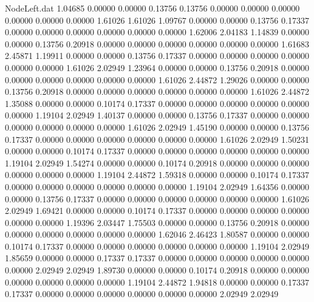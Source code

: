 \begin{filecontents}{NodeLeft.dat}
   1.04685    0.00000    0.00000     0.13756    0.13756    0.00000    0.00000    0.00000    0.00000    0.00000    0.00000    1.61026    1.61026
   1.09767    0.00000    0.00000     0.13756    0.17337    0.00000    0.00000    0.00000    0.00000    0.00000    0.00000    1.62006    2.04183
   1.14839    0.00000    0.00000     0.13756    0.20918    0.00000    0.00000    0.00000    0.00000    0.00000    0.00000    1.61683    2.45871
   1.19911    0.00000    0.00000     0.13756    0.17337    0.00000    0.00000    0.00000    0.00000    0.00000    0.00000    1.61026    2.02949
   1.23964    0.00000    0.00000     0.13756    0.20918    0.00000    0.00000    0.00000    0.00000    0.00000    0.00000    1.61026    2.44872
   1.29026    0.00000    0.00000     0.13756    0.20918    0.00000    0.00000    0.00000    0.00000    0.00000    0.00000    1.61026    2.44872
   1.35088    0.00000    0.00000     0.10174    0.17337    0.00000    0.00000    0.00000    0.00000    0.00000    0.00000    1.19104    2.02949
   1.40137    0.00000    0.00000     0.13756    0.17337    0.00000    0.00000    0.00000    0.00000    0.00000    0.00000    1.61026    2.02949
   1.45190    0.00000    0.00000     0.13756    0.17337    0.00000    0.00000    0.00000    0.00000    0.00000    0.00000    1.61026    2.02949
   1.50231    0.00000    0.00000     0.10174    0.17337    0.00000    0.00000    0.00000    0.00000    0.00000    0.00000    1.19104    2.02949
   1.54274    0.00000    0.00000     0.10174    0.20918    0.00000    0.00000    0.00000    0.00000    0.00000    0.00000    1.19104    2.44872
   1.59318    0.00000    0.00000     0.10174    0.17337    0.00000    0.00000    0.00000    0.00000    0.00000    0.00000    1.19104    2.02949
   1.64356    0.00000    0.00000     0.13756    0.17337    0.00000    0.00000    0.00000    0.00000    0.00000    0.00000    1.61026    2.02949
   1.69421    0.00000    0.00000     0.10174    0.17337    0.00000    0.00000    0.00000    0.00000    0.00000    0.00000    1.19396    2.03447
   1.75503    0.00000    0.00000     0.13756    0.20918    0.00000    0.00000    0.00000    0.00000    0.00000    0.00000    1.62046    2.46423
   1.80587    0.00000    0.00000     0.10174    0.17337    0.00000    0.00000    0.00000    0.00000    0.00000    0.00000    1.19104    2.02949
   1.85659    0.00000    0.00000     0.17337    0.17337    0.00000    0.00000    0.00000    0.00000    0.00000    0.00000    2.02949    2.02949
   1.89730    0.00000    0.00000     0.10174    0.20918    0.00000    0.00000    0.00000    0.00000    0.00000    0.00000    1.19104    2.44872
   1.94818    0.00000    0.00000     0.17337    0.17337    0.00000    0.00000    0.00000    0.00000    0.00000    0.00000    2.02949    2.02949

\end{filecontents}
